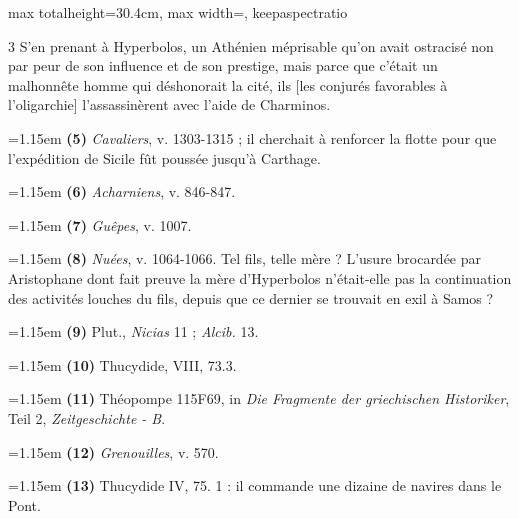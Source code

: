 \documentclass[11pt,twoside]{book}
\newcommand{\italique}[1]{\textit{#1}}
\begin{document}
\begin{adjustbox}{max totalheight=30.4cm, max width=\textwidth, keepaspectratio}
\begin{minipage}{\textwidth}
{\begin{multicols}{3}
{S'en prenant à Hyperbolos, un Athénien méprisable qu'on avait ostracisé non par peur de son influence et de son prestige, mais parce que c'était un malhonnête homme qui déshonorait la cité, ils [les conjurés favorables à l'oligarchie] l'assassinèrent avec l'aide de Charminos.}
\par\vspace{1.5pt}
\noindent\hangindent=1.15em {\color{sepiaNote}\textbf{(5)}} \italique{Cavaliers}, v. 1303-1315 ; il cherchait à renforcer la flotte pour que l'expédition de Sicile fût poussée jusqu'à Carthage.
\par\vspace{1.5pt}
\noindent\hangindent=1.15em {\color{sepiaNote}\textbf{(6)}} \italique{Acharniens}, v. 846-847.
\par\vspace{1.5pt}
\noindent\hangindent=1.15em {\color{sepiaNote}\textbf{(7)}} \italique{Guêpes}, v. 1007.
\par\vspace{1.5pt}
\noindent\hangindent=1.15em {\color{sepiaNote}\textbf{(8)}} \italique{Nuées}, v. 1064-1066. Tel fils, telle mère ? L'usure brocardée par Aristophane dont fait preuve la mère d'Hyperbolos n'était-elle pas la continuation des activités louches du fils, depuis que ce dernier se trouvait en exil à Samos ?
\par\vspace{1.5pt}
\noindent\hangindent=1.15em {\color{sepiaNote}\textbf{(9)}} Plut., \italique{Nicias} 11 ; \italique{Alcib.} 13.
\par\vspace{1.5pt}
\noindent\hangindent=1.15em {\color{sepiaNote}\textbf{(10)}} Thucydide, VIII, 73.3.
\par\vspace{1.5pt}
\noindent\hangindent=1.15em {\color{sepiaNote}\textbf{(11)}} Théopompe 115F69, in \italique{Die Fragmente der griechischen Historiker}, Teil 2, \italique{Zeitgeschichte - B}.
\par\vspace{1.5pt}
\noindent\hangindent=1.15em {\color{sepiaNote}\textbf{(12)}} \italique{Grenouilles}, v. 570.
\par\vspace{1.5pt}
\noindent\hangindent=1.15em {\color{sepiaNote}\textbf{(13)}} Thucydide IV, 75. 1 : il commande une dizaine de navires dans le Pont.
\par\vspace{1.5pt}

\end{multicols}}
\end{minipage}
\end{adjustbox}
\end{document}

